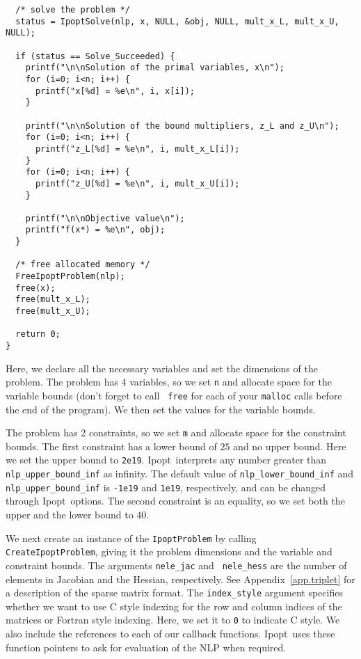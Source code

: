 \documentclass[letter,10pt]{article}
\newcommand{\Ipopt}{{\sc Ipopt}}
\begin{document}
\begin{footnotesize}
\begin{verbatim}
  /* solve the problem */
  status = IpoptSolve(nlp, x, NULL, &obj, NULL, mult_x_L, mult_x_U, NULL);

  if (status == Solve_Succeeded) {
    printf("\n\nSolution of the primal variables, x\n");
    for (i=0; i<n; i++) {
      printf("x[%d] = %e\n", i, x[i]); 
    }

    printf("\n\nSolution of the bound multipliers, z_L and z_U\n");
    for (i=0; i<n; i++) {
      printf("z_L[%d] = %e\n", i, mult_x_L[i]); 
    }
    for (i=0; i<n; i++) {
      printf("z_U[%d] = %e\n", i, mult_x_U[i]); 
    }

    printf("\n\nObjective value\n");
    printf("f(x*) = %e\n", obj); 
  }
 
  /* free allocated memory */
  FreeIpoptProblem(nlp);
  free(x);
  free(mult_x_L);
  free(mult_x_U);

  return 0;
}
\end{verbatim}
\end{footnotesize}

Here, we declare all the necessary variables and set the dimensions of
the problem.  The problem has 4 variables, so we set {\tt n} and
allocate space for the variable bounds (don't forget to call {\tt
  free} for each of your {\tt malloc} calls before the end of the
program). We then set the values for the variable bounds.

The problem has 2 constraints, so we set {\tt m} and allocate space
for the constraint bounds. The first constraint has a lower bound of
$25$ and no upper bound.  Here we set the upper bound to
\texttt{2e19}. \Ipopt\ interprets any number greater than
\texttt{nlp\_upper\_bound\_inf} as infinity. The default value of
\texttt{nlp\_lower\_bound\_inf} and \texttt{nlp\_upper\_bound\_inf} is
\texttt{-1e19} and \texttt{1e19}, respectively, and can be changed
through \Ipopt\ options.  The second constraint is an equality, so we
set both the upper and the lower bound to 40.

We next create an instance of the {\tt IpoptProblem} by calling {\tt
CreateIpoptProblem}, giving it the problem dimensions and the variable
and constraint bounds. The arguments {\tt nele\_jac} and {\tt
nele\_hess} are the number of elements in Jacobian and the Hessian,
respectively. See Appendix~\ref{app.triplet} for a description of the
sparse matrix format. The {\tt index\_style} argument specifies whether
we want to use C style indexing for the row and column indices of the
matrices or Fortran style indexing. Here, we set it to {\tt 0} to
indicate C style.  We also include the references to each of our
callback functions. \Ipopt\ uses these function pointers to ask for
evaluation of the NLP when required.
\end{document}
